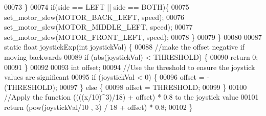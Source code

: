 \begin{DoxyCode}
00073   \}
00074   \textcolor{keywordflow}{if}(side == LEFT || side == BOTH)\{
00075     set_motor_slew(MOTOR_BACK_LEFT, speed);
00076     set_motor_slew(MOTOR_MIDDLE_LEFT, speed);
00077     set_motor_slew(MOTOR_FRONT_LEFT, speed);
00078   \}
00079 \}
00080 
00087 \textcolor{keyword}{static} \textcolor{keywordtype}{float} joystickExp(\textcolor{keywordtype}{int} joystickVal) \{
00088     \textcolor{comment}{//make the offset negative if moving backwards}
00089     \textcolor{keywordflow}{if} (abs(joystickVal) < THRESHOLD) \{
00090             \textcolor{keywordflow}{return} 0;
00091     \}
00092 
00093     \textcolor{keywordtype}{int} offset;
00094   \textcolor{comment}{//Use the threshold to ensure the joystick values are significant}
00095     \textcolor{keywordflow}{if} (joystickVal < 0) \{
00096         offset = - (THRESHOLD);
00097     \} \textcolor{keywordflow}{else} \{
00098         offset = THRESHOLD;
00099     \}
00100   \textcolor{comment}{//Apply the function ((((x/10)^3)/18) + offset) * 0.8 to the joystick value}
00101     \textcolor{keywordflow}{return} (pow(joystickVal/10 , 3) / 18 + offset) * 0.8;
00102 \}
\end{DoxyCode}
